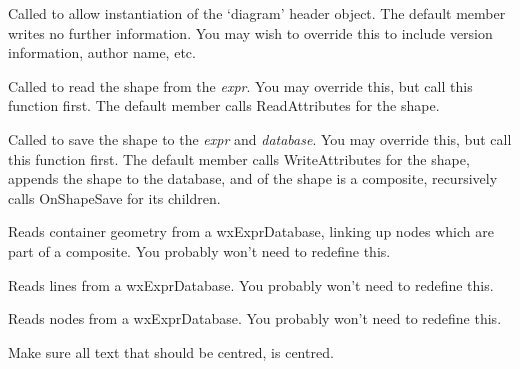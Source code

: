 
Called to allow instantiation of the `diagram' header object. The default member writes no further information.
You may wish to override this to include version information, author name, etc.



Called to read the shape from the {\it expr}. You may override this, but call this function first.
The default member calls ReadAttributes for the shape.



Called to save the shape to the {\it expr} and {\it database}. You may override this, but call this function first.
The default member calls WriteAttributes for the shape, appends the shape to the database, and of the shape
is a composite, recursively calls OnShapeSave for its children.



Reads container geometry from a wxExprDatabase, linking up nodes which
are part of a composite. You probably won't need to redefine this.



Reads lines from a wxExprDatabase. You probably won't need to redefine this.



Reads nodes from a wxExprDatabase. You probably won't need to redefine this.



Make sure all text that should be centred, is centred.


